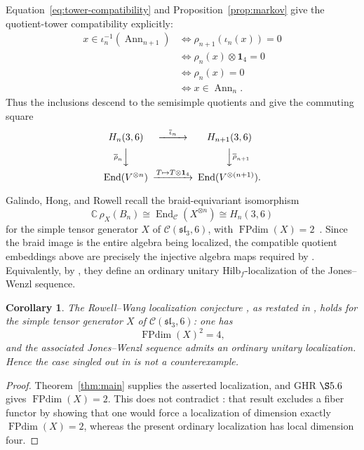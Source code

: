 \documentclass[11pt]{article}
\newtheorem{corollary}[theorem]{Corollary}
\theoremstyle{remark}
\newcommand{\Id}{\mathbf 1}
\newcommand{\End}{\operatorname{End}}
\newcommand{\bbC}{\mathbb C}
\newcommand{\cC}{\mathcal C}
\begin{document}
Equation~\eqref{eq:tower-compatibility} and Proposition~\ref{prop:markov}
give the quotient-tower compatibility explicitly:
\[
\begin{aligned}
  x\in\iota_n^{-1}(\operatorname{Ann}_{n+1})
  &\Longleftrightarrow \rho_{n+1}(\iota_n(x))=0\\
  &\Longleftrightarrow \rho_n(x)\otimes\Id_4=0\\
  &\Longleftrightarrow \rho_n(x)=0\\
  &\Longleftrightarrow x\in\operatorname{Ann}_n.
\end{aligned}
\]
Thus the inclusions descend to the semisimple quotients and give the
commuting square
\[
\begin{CD}
  H_n(3,6) @>{\overline\iota_n}>> H_{n+1}(3,6)\\
  @V{\overline\rho_n}VV @VV{\overline\rho_{n+1}}V\\
  \End(V^{\otimes n}) @>{T\mapsto T\otimes\Id_4}>>
  \End(V^{\otimes(n+1)}).
\end{CD}
\]

Galindo, Hong, and Rowell recall the braid-equivariant isomorphism
\[
  \bbC\,\rho_X(B_n)
  \cong\End_{\cC}(X^{\otimes n})\cong H_n(3,6)
\]
for the simple tensor generator \(X\) of \(\cC(\mathfrak{sl}_3,6)\), with
\(\operatorname{FPdim}(X)=2\)~\cite[\S5.6]{GHR2013}.  Since the braid image is
the entire algebra being localized, the compatible quotient embeddings above
are precisely the injective algebra maps required by
\cite{GHR2013}.  Equivalently, by
\cite[Proposition~4.12 and Definition~4.13]{GHR2013}, they define an ordinary
unitary \(\mathrm{Hilb}_f\)-localization of the Jones--Wenzl sequence.

\begin{corollary}\label{cor:not-counterexample}
The Rowell--Wang localization conjecture
\cite{RowellWang2012}, as restated in
\cite{GHR2013}, holds for the simple tensor generator \(X\) of
\(\cC(\mathfrak{sl}_3,6)\): one has
\[
  \operatorname{FPdim}(X)^2=4,
\]
and the associated Jones--Wenzl sequence admits an ordinary unitary
localization.  Hence the case singled out in
\cite[Remark~6.2(2)]{GHR2013} is not a counterexample.
\end{corollary}

\begin{proof}
Theorem~\ref{thm:main} supplies the asserted localization, and GHR \(\S5.6\)
gives \(\operatorname{FPdim}(X)=2\).  This does not contradict
\cite[Theorem~5.27]{GHR2013}: that result excludes a fiber functor by showing
that one would force a localization of dimension exactly
\(\operatorname{FPdim}(X)=2\), whereas the present ordinary localization has
local dimension four.
\end{proof}
\end{document}
